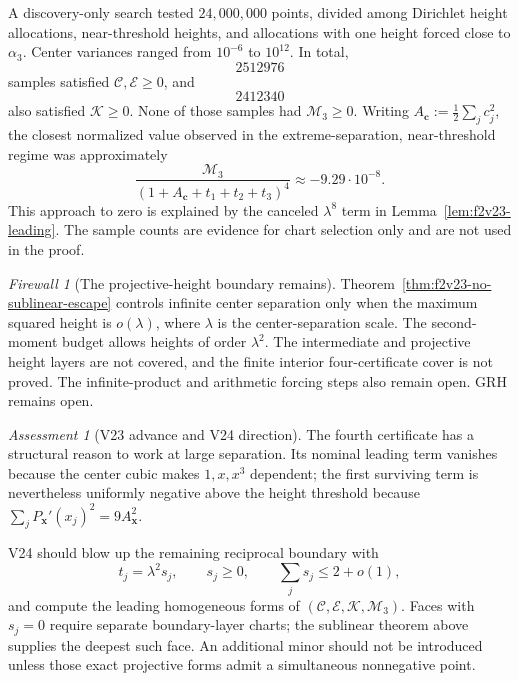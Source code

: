 \documentclass[11pt]{article}
\theoremstyle{definition}
\theoremstyle{remark}
\newtheorem{assessment}[theorem]{Assessment}
\newtheorem{firewall}[theorem]{Firewall}
\begin{document}
A discovery-only search tested \(24{,}000{,}000\) points, divided among
Dirichlet height allocations, near-threshold heights, and allocations with
one height forced close to \(\alpha_3\).  Center variances ranged from
\(10^{-6}\) to \(10^{12}\).  In total,
\[
 2512976
\tag{N23.22}
\]
samples satisfied \(\mathcal C,\mathcal E\geq0\), and
\[
 2412340
\tag{N23.23}
\]
also satisfied \(\mathcal K\geq0\).  None of those samples had
\(\mathcal M_3\geq0\).  Writing \(A_{\bm c}:=\frac12\sum_jc_j^2\), the closest normalized value observed in the
extreme-separation, near-threshold regime was approximately
\[
 \frac{\mathcal M_3}
 {(1+A_{\bm c}+t_1+t_2+t_3)^4}
 \approx-9.29\cdot10^{-8}.
 \tag{N23.24}
\]
This approach to zero is explained by the canceled \(\lambda^8\) term in
Lemma~\ref{lem:f2v23-leading}.  The sample counts are evidence for chart
selection only and are not used in the proof.

\begin{firewall}[The projective-height boundary remains]
\label{fire:f2v23}
Theorem~\ref{thm:f2v23-no-sublinear-escape} controls infinite center
separation only when the maximum squared height is \(o(\lambda)\), where
\(\lambda\) is the center-separation scale.  The second-moment budget
allows heights of order \(\lambda^2\).  The intermediate and projective
height layers are not covered, and the finite interior four-certificate
cover is not proved.  The infinite-product and arithmetic forcing steps
also remain open.  GRH remains open.
\end{firewall}

\begin{assessment}[V23 advance and V24 direction]
\label{ass:f2v23}
The fourth certificate has a structural reason to work at large
separation.  Its nominal leading term vanishes because the center cubic
makes \(1,x,x^3\) dependent; the first surviving term is nevertheless
uniformly negative above the height threshold because
\(\sum_jP_{\bm x}'(x_j)^2=9A_{\bm x}^2\).

V24 should blow up the remaining reciprocal boundary with
\[
 t_j=\lambda^2s_j,\qquad
 s_j\geq0,\qquad \sum_js_j\leq2+o(1),
 \tag{N23.25}
\]
and compute the leading homogeneous forms of
\((\mathcal C,\mathcal E,\mathcal K,\mathcal M_3)\).
Faces with \(s_j=0\) require separate boundary-layer charts; the
sublinear theorem above supplies the deepest such face.  An additional
minor should not be introduced unless those exact projective forms admit
a simultaneous nonnegative point.
\end{assessment}
\end{document}
